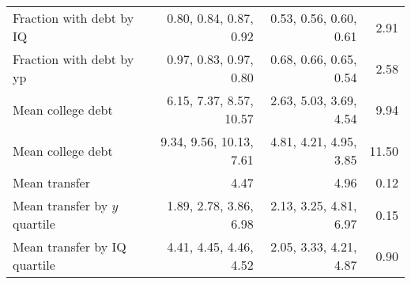 \begin{tabular}{lrrr}
Fraction with debt by IQ & 0.80, 0.84, 0.87, 0.92  & 0.53, 0.56, 0.60, 0.61  & 2.91  \\ 
Fraction with debt by yp & 0.97, 0.83, 0.97, 0.80  & 0.68, 0.66, 0.65, 0.54  & 2.58  \\ 
Mean college debt & 6.15, 7.37, 8.57, 10.57  & 2.63, 5.03, 3.69, 4.54  & 9.94  \\ 
Mean college debt & 9.34, 9.56, 10.13, 7.61  & 4.81, 4.21, 4.95, 3.85  & 11.50  \\ 
Mean transfer & 4.47  & 4.96  & 0.12  \\ 
Mean transfer by $y$ quartile & 1.89, 2.78, 3.86, 6.98  & 2.13, 3.25, 4.81, 6.97  & 0.15  \\ 
Mean transfer by IQ quartile & 4.41, 4.45, 4.46, 4.52  & 2.05, 3.33, 4.21, 4.87  & 0.90  \\ 
\hline
\end{tabular}%

